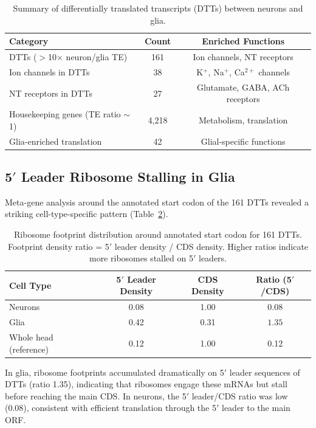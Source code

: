\documentclass[11pt]{article}
\begin{document}
\begin{table}[H]
\centering
\caption{Summary of differentially translated transcripts (DTTs) between neurons and glia.}
\label{tab:dtt}
\begin{tabular}{lcc}
\toprule
Category & Count & Enriched Functions \\
\midrule
DTTs ($>$10$\times$ neuron/glia TE) & 161 & Ion channels, NT receptors \\
Ion channels in DTTs & 38 & K$^+$, Na$^+$, Ca$^{2+}$ channels \\
NT receptors in DTTs & 27 & Glutamate, GABA, ACh receptors \\
Housekeeping genes (TE ratio $\sim$1) & 4,218 & Metabolism, translation \\
Glia-enriched translation & 42 & Glial-specific functions \\
\bottomrule
\end{tabular}
\end{table}

\subsection{5$'$ Leader Ribosome Stalling in Glia}

Meta-gene analysis around the annotated start codon of the 161 DTTs revealed a striking cell-type-specific pattern (Table~\ref{tab:5prime}).

\begin{table}[H]
\centering
\caption{Ribosome footprint distribution around annotated start codon for 161 DTTs. Footprint density ratio = 5$'$ leader density / CDS density. Higher ratios indicate more ribosomes stalled on 5$'$ leaders.}
\label{tab:5prime}
\begin{tabular}{lccc}
\toprule
Cell Type & 5$'$ Leader Density & CDS Density & Ratio (5$'$/CDS) \\
\midrule
Neurons & 0.08 & 1.00 & 0.08 \\
Glia & 0.42 & 0.31 & $\mathbf{1.35}$ \\
Whole head (reference) & 0.12 & 1.00 & 0.12 \\
\bottomrule
\end{tabular}
\end{table}

In glia, ribosome footprints accumulated dramatically on 5$'$ leader sequences of DTTs (ratio 1.35), indicating that ribosomes engage these mRNAs but stall before reaching the main CDS. In neurons, the 5$'$ leader/CDS ratio was low (0.08), consistent with efficient translation through the 5$'$ leader to the main ORF.
\end{document}
